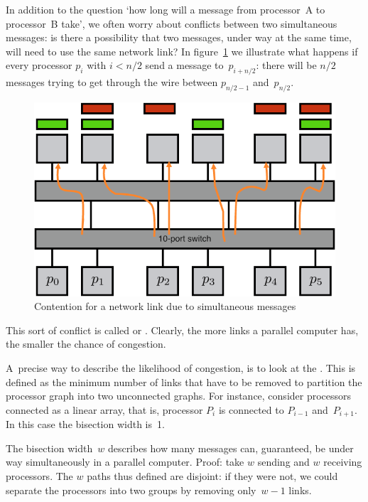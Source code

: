 In addition to the question `how long will a message from processor~A
to processor~B take', we often worry about conflicts between two
simultaneous messages: is there a possibility that two messages, under
way at the same time, will need to use the same network link? In
figure~\ref{fig:contention} we illustrate what happens if every
processor $p_i$ with $i<n/2$ send a message to~$p_{i+n/2}$: there will
be $n/2$ messages trying to get through the wire between $p_{n/2-1}$
and~$p_{n/2}$.
\begin{figure}[ht]
  \includegraphics[scale=.4]{graphics/contention}
  \caption{Contention for a network link due to simultaneous messages}
  \label{fig:contention}
\end{figure}
This
sort of conflict is called  or
. Clearly, the more links a
parallel computer has, the smaller the chance of congestion.


A~precise way to describe the likelihood of congestion, is
to look at the . This is defined as the
minimum number of links that have to be removed to partition the
processor graph into two unconnected graphs. For instance, consider
processors connected as a linear array, that is, processor $P_i$ is
connected to $P_{i-1}$ and~$P_{i+1}$. In this case the bisection width
is~1.

The bisection width~$w$ describes how many messages can, guaranteed,
be under way simultaneously in a parallel computer. Proof: take $w$
sending and $w$ receiving processors. The $w$ paths thus defined are
disjoint: if they were not, we could separate the processors into two
groups by removing only~$w-1$ links. 

